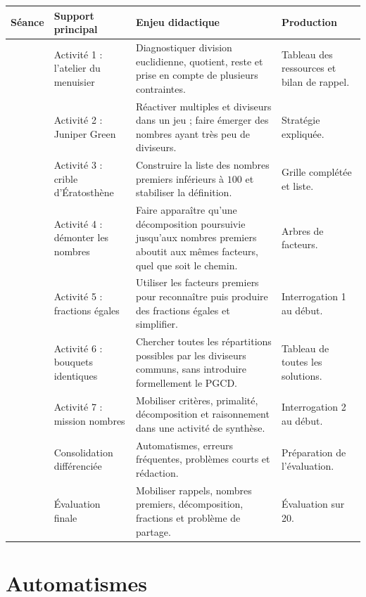 \documentclass[12pt,a4paper]{article}
\begin{document}
\renewcommand{\arraystretch}{1.35}
\begin{tabularx}{\textwidth}{
|>{\centering\arraybackslash}p{1.05cm}
|>{\raggedright\arraybackslash}p{4.2cm}
|>{\raggedright\arraybackslash}X
|>{\raggedright\arraybackslash}p{3cm}|}
\hline
\textbf{Séance} & \textbf{Support principal} &
\textbf{Enjeu didactique} & \textbf{Production}\\
\hline
1 & Activité 1 : l'atelier du menuisier &
Diagnostiquer division euclidienne, quotient, reste et prise en compte
de plusieurs contraintes. & Tableau des ressources et bilan de rappel.\\
\hline
2 & Activité 2 : Juniper Green &
Réactiver multiples et diviseurs dans un jeu ; faire émerger
des nombres ayant très peu de diviseurs. & Stratégie expliquée.\\
\hline
3 & Activité 3 : crible d'Ératosthène &
Construire la liste des nombres premiers inférieurs à \(100\)
et stabiliser la définition. & Grille complétée et liste.\\
\hline
4 & Activité 4 : démonter les nombres &
Faire apparaître qu'une décomposition poursuivie jusqu'aux nombres premiers
aboutit aux mêmes facteurs, quel que soit le chemin. & Arbres de facteurs.\\
\hline
5 & Activité 5 : fractions égales &
Utiliser les facteurs premiers pour reconnaître puis produire
des fractions égales et simplifier. & Interrogation 1 au début.\\
\hline
6 & Activité 6 : bouquets identiques &
Chercher toutes les répartitions possibles par les diviseurs communs,
sans introduire formellement le PGCD. & Tableau de toutes les solutions.\\
\hline
7 & Activité 7 : mission nombres &
Mobiliser critères, primalité, décomposition et raisonnement
dans une activité de synthèse. & Interrogation 2 au début.\\
\hline
8 & Consolidation différenciée &
Automatismes, erreurs fréquentes, problèmes courts et rédaction. &
Préparation de l'évaluation.\\
\hline
9 & Évaluation finale &
Mobiliser rappels, nombres premiers, décomposition, fractions
et problème de partage. & Évaluation sur 20.\\
\hline
\end{tabularx}

\section*{Automatismes}
\end{document}
